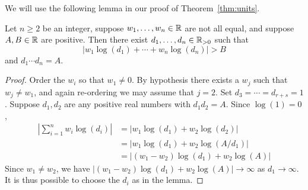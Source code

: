 We will use the following lemma in our
proof of Theorem~\ref{thm:units}.
\begin{lemma}\label{lem:chooseci}
Let $n\geq 2$ be an integer, suppose $w_1,\ldots, w_n\in\mathbb{R}$
are not all equal, and suppose $A, B\in\mathbb{R}$ are positive. Then
there exist $d_1,\ldots, d_{n} \in \mathbb{R}_{>0}$ such that
$$|w_1\log(d_1)+\cdots +w_{n}\log(d_{n})| > B$$
and $d_1\cdots d_n = A$.
\end{lemma}
\begin{proof}
Order the $w_i$ so
that $w_1\neq 0$.  By hypothesis there exists a $w_j$ such that
$w_j\neq w_1$, and again re-ordering we may assume that $j=2$.  Set
$d_3=\cdots=d_{r+s}=1$.  Suppose $d_1, d_2$ are any positive real numbers
with  $d_1 d_2 = A$.  Since $\log(1)=0$,
\begin{align*}
  \left|\sum_{i=1}^{n} w_i \log(d_i)\right|
  &= |w_1\log(d_1) + w_2\log(d_2)|\\
  &= |w_1 \log(d_1) + w_2\log(A/d_1)| \\
  &= |(w_1-w_2)\log(d_1) + w_2\log(A)|
\end{align*}
Since $w_1\neq w_2$,  we have $|(w_1-w_2)\log(d_1) + w_2\log(A)|\to\infty$
as $d_1\to \infty$.  It is thus possible to choose the $d_i$ as in the lemma.
\end{proof}

